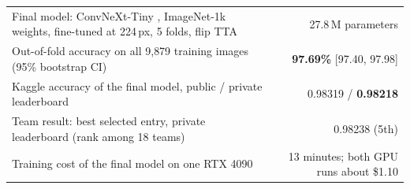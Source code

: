 \documentclass[11pt,a4paper]{article}
\begin{document}
\begin{titlepage}
\vfill
\begin{keybox}[title={Result at a glance}]
\small
\begin{tabularx}{\linewidth}{@{}Xr@{}}
Final model: ConvNeXt-Tiny \cite{liu2022convnext}, ImageNet-1k weights, fine-tuned at 224\,px, 5 folds, flip TTA & 27.8\,M parameters\\
Out-of-fold accuracy on all 9{,}879 training images (95\% bootstrap CI) & \textbf{97.69\%} [97.40, 97.98]\\
Kaggle accuracy of the final model, public / private leaderboard & 0.98319 / \textbf{0.98218}\\
Team result: best selected entry, private leaderboard (rank among 18 teams) & 0.98238 (5th)\\
Training cost of the final model on one RTX 4090 & 13 minutes; both GPU runs about \$1.10\\
\end{tabularx}
\end{keybox}
\end{titlepage}

\setcounter{page}{2}
\end{document}
